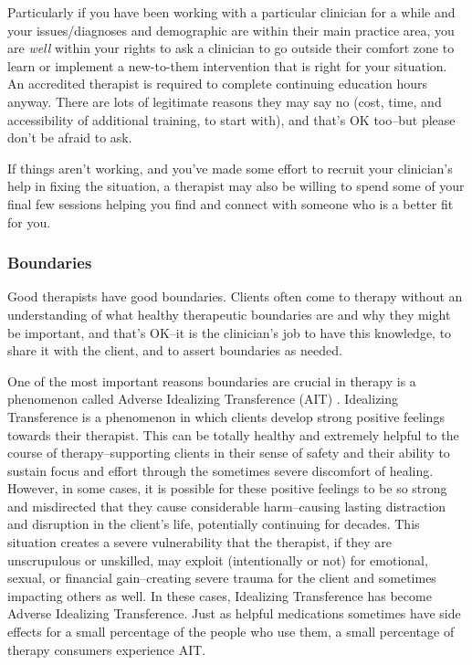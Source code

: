 \documentclass[12pt,letterpaper]{book}
\begin{document}
Particularly if you have been working with a particular clinician for a while and your issues/diagnoses and demographic are within their main practice area, you are \textit{well} within your rights to ask a clinician to go outside their comfort zone to learn or implement a new-to-them intervention that is right for your situation. An accredited therapist is required to complete continuing education hours anyway. There are lots of legitimate reasons they may say no (cost, time, and accessibility of additional training, to start with), and that's OK too–but please don't be afraid to ask.

If things aren't working, and you've made some effort to recruit your clinician's help in fixing the situation, a therapist may also be willing to spend some of your final few sessions helping you find and connect with someone who is a better fit for you.

\subsubsection*{Boundaries}
Good therapists have good boundaries. Clients often come to therapy without an understanding of what healthy therapeutic boundaries are and why they might be important, and that's OK–it is the clinician's job to have this knowledge, to share it with the client, and to assert boundaries as needed.

\label{def:ait}
One of the most important reasons boundaries are crucial in therapy is a phenomenon called Adverse Idealizing Transference (AIT) \cite{hook2018boundary,transferranceLoveHarm}. Idealizing Transference is a phenomenon in which clients develop strong positive feelings towards their therapist. This can be totally healthy and extremely helpful to the course of therapy–supporting clients in their sense of safety and their ability to sustain focus and effort through the sometimes severe discomfort of healing. However, in some cases, it is possible for these positive feelings to be so strong and misdirected that they cause considerable harm–causing lasting distraction and disruption in the client's life, potentially continuing for decades. This situation creates a severe vulnerability that the therapist, if they are unscrupulous or unskilled, may exploit (intentionally or not) for emotional, sexual, or financial gain–creating severe trauma for the client and sometimes impacting others as well. In these cases, Idealizing Transference has become Adverse Idealizing Transference. Just as helpful medications sometimes have side effects for a small percentage of the people who use them, a small percentage of therapy consumers experience AIT.
\end{document}
